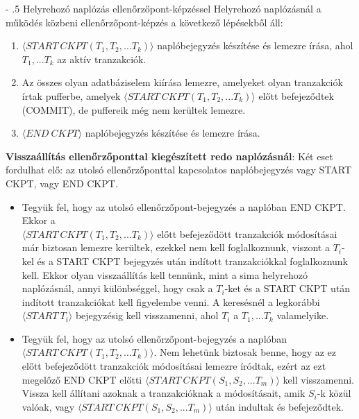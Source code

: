 \documentclass[margin=0px]{article}
\makeatletter
\renewcommand\paragraph{%
	\@startsection{paragraph}{4}{0mm}%
	{-\baselineskip}%
	{.5\baselineskip}%
	{\normalfont\normalsize\bfseries}}
\makeatother
\begin{document}
\paragraph{Helyrehozó naplózás ellenőrzőpont-képzéssel}
Helyrehozó naplózásnál a működés közbeni ellenőrzőpont-képzés a következő lépésekből áll:
\begin{enumerate}
    \item	$\langle START \ CKPT(T_{1},T_{2},...T_{k}) \rangle$ naplóbejegyzés készítése és lemezre írása, ahol
          $T_{1}, ... T_{k}$ az aktív tranzakciók.

    \item	Az összes olyan adatbáziselem kiírása lemezre, amelyeket olyan tranzakciók írtak pufferbe, amelyek
          $\langle START \ CKPT(T_{1},T_{2},...T_{k}) \rangle$ előtt befejeződtek (COMMIT), de puffereik még nem kerültek
          lemezre.

    \item	$\langle END \ CKPT \rangle$ naplóbejegyzés készítése és lemezre írása.
\end{enumerate}

\noindent \textbf{Visszaállítás ellenőrzőponttal kiegészített redo naplózásnál}:
Két eset fordulhat elő: az utolsó ellenőrzőponttal kapcsolatos naplóbejegyzés vagy START CKPT, vagy END CKPT.

\begin{itemize}
    \item	Tegyük fel, hogy az utolsó ellenőrzőpont-bejegyzés a naplóban END CKPT. Ekkor a\\
          $\langle START \ CKPT(T_{1},T_{2},...T_{k}) \rangle$ előtt befejeződött tranzakciók módosításai már biztosan lemezre kerültek, ezekkel nem kell foglalkoznunk, viszont
          a $T_{i}$-kel és a START CKPT bejegyzés után indított tranzakciókkal foglalkoznunk kell. Ekkor olyan visszaállítás kell tennünk,
          mint a sima helyrehozó naplózásnál, annyi különbséggel, hogy csak a $T_{i}$-ket és a START CKPT után indított tranzakciókat
          kell figyelembe venni. A keresésnél a legkorábbi $\langle START \ T_{i}\rangle$ bejegyzésig kell visszamenni, ahol $T_{i}$ a
          $T_{1},...T_{k}$ valamelyike.

    \item	Tegyük fel, hogy az utolsó ellenőrzőpont-bejegyzés a naplóban $\langle START \ CKPT(T_{1},T_{2},...T_{k}) \rangle$.
          Nem lehetünk biztosak benne, hogy az ez előtt befejeződött tranzakciók módosításai lemezre íródtak, ezért az ezt megelőző
          END CKPT előtti $\langle START \ CKPT(S_{1},S_{2},...T_{m}) \rangle$ kell visszamenni. Vissza kell állítani azoknak a
          tranzakcióknak a módosításait, amik $S_{i}$-k közül valóak, vagy $\langle START \ CKPT(S_{1},S_{2},...T_{m}) \rangle$
          után indultak és befejeződtek.
\end{itemize}
\end{document}
